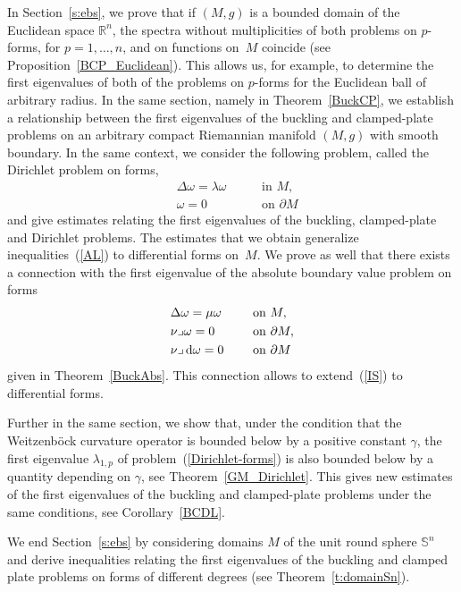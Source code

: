 \documentclass[pdftex]{sigma}
\newcommand{\R}{{\mathbb R}}
\numberwithin{equation}{section}
\theoremstyle{definition}
\begin{document}
In Section~\ref{s:ebs}, we prove that if $(M,g)$ is a bounded domain of the Euclidean space $\R^n$, the spectra without multiplicities of both problems on $p$-forms, for $p=1,\dots,n$, and on functions on~$M$ coincide (see Proposition~\ref{BCP_Euclidean}).
This allows us, for example, to determine the first eigenvalues of both of the problems on $p$-forms for the Euclidean ball of arbitrary radius.
In the same section, namely in Theorem~\ref{BuckCP}, we establish a relationship between the first eigenvalues of the buckling and clamped-plate problems on an arbitrary compact Riemannian manifold $(M,g)$ with smooth boundary.
In the same context, we consider the following problem, called the Dirichlet problem on forms,
\begin{equation}
\begin{aligned}
&\Delta \omega =\lambda \omega\ \quad &&\textrm{in } M, \\
&\omega = 0\ \quad &&\textrm{on } \partial M
\end{aligned}\label{Dirichlet-forms}
\end{equation}
and give estimates relating the first eigenvalues of the buckling, clamped-plate and Dirichlet problems. The estimates that we obtain generalize inequalities~(\ref{AL}) to differential forms on~$M$.
We prove as well that there exists a connection %
with the first eigenvalue of the absolute boundary value problem on forms
\[
\begin{aligned}
&\Delta \omega =\mu \omega \ \quad&&\textrm{on } M, \\
&\nu\lrcorner \omega = 0 \ \quad&& \textrm{on } \partial M, \\
&\nu \lrcorner \, {\rm d}\omega = 0 \ \quad&& \textrm{on } \partial M
\end{aligned}
\]
given in Theorem~\ref{BuckAbs}.
This connection allows to extend~(\ref{IS}) to differential forms.

Further in the same section, we show that, under the condition that the Weitzenb\"ock curvature operator is bounded below by a positive constant $\gamma$, the first eigenvalue $\lambda_{1,p}$ of problem~(\ref{Dirichlet-forms}) is also bounded below by a quantity depending on $\gamma$, see Theorem~\ref{GM_Dirichlet}.
This gives new estimates of the first eigenvalues of the buckling and clamped-plate problems under the same conditions, see Corollary~\ref{BCDL}.

We end Section~\ref{s:ebs} by considering domains $M$ of the unit round sphere $\mathbb{S}^n$ and derive inequalities relating the first eigenvalues of the buckling and clamped plate problems on forms of different degrees (see Theorem~\ref{t:domainSn}).
\end{document}
